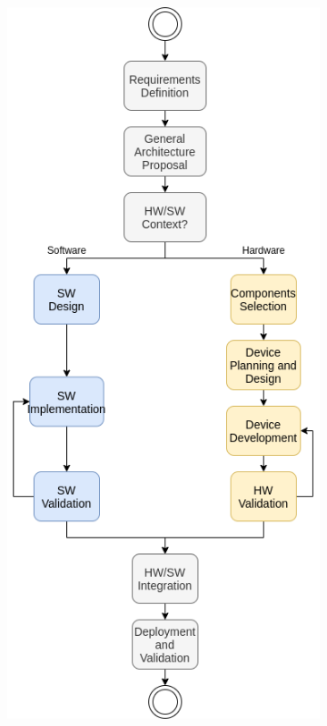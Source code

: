 \begin{figure}[ht]
\centering
\begin{subfigure}{.4\textwidth}
  \centering
  \includegraphics[width=.95\linewidth]{Figures/codesign-1.0.png}  

\end{subfigure}
\end{figure}
